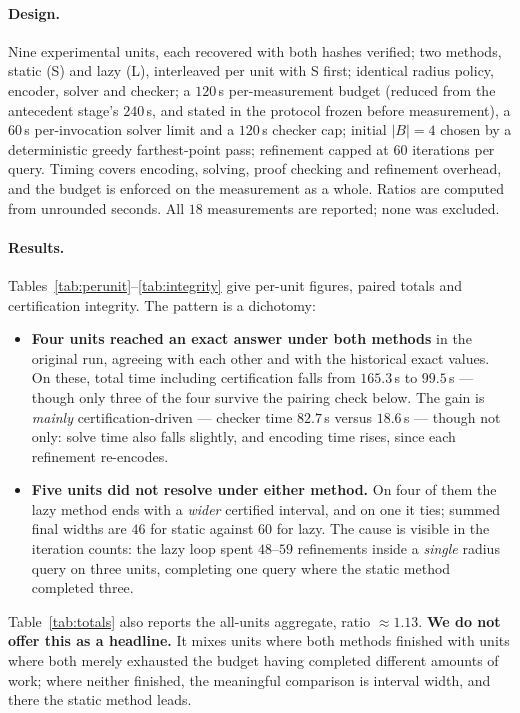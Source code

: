 \documentclass[11pt,a4paper]{article}
\theoremstyle{plain}
\theoremstyle{definition}
\theoremstyle{remark}
\begin{document}
\paragraph{Design.} Nine experimental units, each recovered with both hashes
verified; two methods, static (S) and lazy (L), interleaved per unit with S
first; identical radius policy, encoder, solver and checker; a $120$\,s
per-measurement budget (reduced from the antecedent stage's $240$\,s, and stated
in the protocol frozen before measurement), a $60$\,s per-invocation solver
limit and a $120$\,s checker cap; initial $|B| = 4$ chosen by a deterministic
greedy farthest-point pass; refinement capped at $60$ iterations per query.
Timing covers encoding, solving, proof checking and refinement overhead, and the
budget is enforced on the measurement as a whole. Ratios are computed from
unrounded seconds. All $18$ measurements are reported; none was excluded.

\paragraph{Results.} Tables~\ref{tab:perunit}--\ref{tab:integrity} give per-unit figures, paired totals and
certification integrity. The pattern is a dichotomy:

\begin{itemize}[nosep]
\item \textbf{Four units reached an exact answer under both methods} in the
      original run, agreeing with each other and with the historical exact
      values. On these, total time including certification falls from
      $165.3$\,s to $99.5$\,s --- though only three of the four survive the
      pairing check below. The gain is
      \emph{mainly} certification-driven --- checker time $82.7$\,s versus
      $18.6$\,s --- though not only: solve time also falls slightly, and
      encoding time rises, since each refinement re-encodes.
\item \textbf{Five units did not resolve under either method.} On four of them
      the lazy method ends with a \emph{wider} certified interval, and on one it
      ties; summed final widths are $46$ for static against $60$ for lazy. The
      cause is visible in the iteration counts: the lazy loop spent $48$--$59$
      refinements inside a \emph{single} radius query on three units, completing
      one query where the static method completed three.
\end{itemize}

Table~\ref{tab:totals} also reports the all-units aggregate, ratio $\approx 1.13$. \textbf{We do
not offer this as a headline.} It mixes units where both methods finished with
units where both merely exhausted the budget having completed different amounts
of work; where neither finished, the meaningful comparison is interval width,
and there the static method leads.
\end{document}
